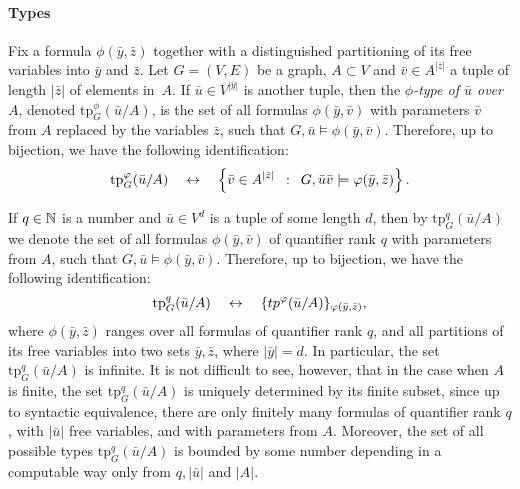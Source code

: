 \paragraph{Types}
\newcommand{\tp}{\mathrm{tp}}
Fix a formula $\phi(\bar y,\bar z)$ together with a distinguished partitioning of its free variables into $\bar y$ and $\bar z$.
Let $G=(V,E)$ be a graph, $A\subset V$ and $\bar v\in A^{|\bar z|}$ a tuple of length $|\bar z|$ of elements in~$A$.
If $\bar u\in V^{|\bar y|}$ is another tuple, then the 
\emph{$\phi$-type of $\bar u$ over $A$},
denoted $\tp^\phi_G(\bar u/A)$,
is the set of all
formulas  $\phi(\bar y,\bar v)$ 
with parameters $\bar v$ from $A$
replaced by the variables $\bar z$,
such that $G,\bar u\models \phi(\bar y,\bar v)$.
Therefore, up to  bijection, we have the following identification:
$$\tp^\phi_G(\bar u/A)\quad\leftrightarrow\quad\setof{\bar v\in  A^{|\bar z|}}{G, \bar u\bar v\models \phi(\bar y,\bar z)}.$$


If $q\in \mathbb{N}$ is a number and $\bar u\in  V^{d}$
is a tuple of some length $d$, then by $\tp^q_G(\bar u/A)$  we denote the set of all formulas $\phi(\bar y,\bar v)$
of quantifier rank $q$ with parameters from $A$,
such that $G,\bar u\models \phi(\bar y,\bar v)$.
Therefore, up to  bijection, we have the following identification:
$$\tp^q_G(\bar u/A)\quad\leftrightarrow\quad\set{tp^\phi(\bar u/A)}_{\phi(\bar y,\bar z)},$$
where $\phi(\bar y,\bar z)$ ranges over all formulas of quantifier rank $q$, and all partitions of its free variables into two sets $\bar y,\bar z$,
where $|\bar y|=d$. 
In particular, the set $\tp^q_G(\bar u/A)$ is infinite.
It is not difficult to see, however, that in the case when $A$ is finite,
the set $\tp^q_G(\bar u/A)$ is uniquely determined by its finite subset, since up to syntactic equivalence, there are only finitely many formulas of quantifier rank $q$, with $|\bar u|$ free variables, and with parameters from $A$.
Moreover, the set of all possible types 
$\tp^q_G(\bar u/A)$ is bounded by some number 
depending in a computable way only from 
$q,|\bar u|$ and $|A|$.

